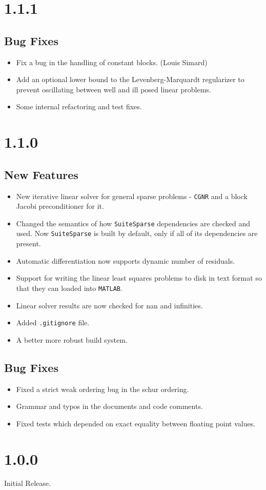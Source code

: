 \section*{1.1.1}
\subsection{Bug Fixes}
\begin{itemize}
\item Fix a bug in the handling of constant blocks. (Louis Simard)
\item Add an optional lower bound to the Levenberg-Marquardt regularizer to prevent oscillating between well and ill posed linear problems.
\item Some internal refactoring and test fixes.
\end{itemize}
\section{1.1.0}
\subsection{New Features}
\begin{itemize}
\item New iterative linear solver for general sparse problems - \texttt{CGNR} and a block Jacobi preconditioner for it.
\item Changed the semantics of how \texttt{SuiteSparse} dependencies are checked and used. Now \texttt{SuiteSparse} is built by default, only if all of its dependencies are present.
\item Automatic differentiation now supports dynamic number of residuals.
\item Support for writing the linear least squares problems to disk in text format so that they can loaded into \texttt{MATLAB}.
\item Linear solver results are now checked for nan and infinities.
\item Added \texttt{.gitignore} file.
\item A better more robust build system.
\end{itemize}

\subsection{Bug Fixes}
\begin{itemize}
\item Fixed a strict weak ordering bug in the schur ordering.
\item Grammar and typos in the documents and code comments.
\item Fixed tests which depended on exact equality between floating point values.
\end{itemize}
\section*{1.0.0}
Initial Release.
